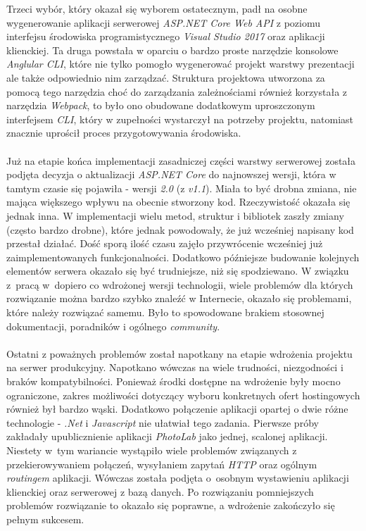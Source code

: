 Trzeci wybór, który okazał się wyborem ostatecznym, padł na osobne wygenerowanie aplikacji serwerowej \textit{ASP.NET Core Web API} z poziomu interfejsu środowiska programistycznego \textit{Visual Studio 2017} oraz aplikacji klienckiej. Ta druga powstała w oparciu o bardzo proste narzędzie konsolowe \textit{Anglular CLI}, które nie tylko pomogło wygenerować projekt warstwy prezentacji ale także odpowiednio nim zarządzać. Struktura projektowa utworzona za pomocą tego narzędzia choć do zarządzania zależnościami również korzystała z narzędzia \textit{Webpack}, to było ono obudowane dodatkowym uproszczonym interfejsem \textit{CLI}, który w zupełności wystarczył na potrzeby projektu, natomiast znacznie uprościł proces przygotowywania środowiska.\\
\\
Już na etapie końca implementacji zasadniczej części warstwy serwerowej została podjęta decyzja o aktualizacji \textit{ASP.NET Core} do najnowszej wersji, która w tamtym czasie się pojawiła - wersji \textit{2.0} (z \textit{v1.1}). Miała to być drobna zmiana, nie mająca większego wpływu na obecnie stworzony kod. Rzeczywistość okazała się jednak inna. W implementacji wielu metod, struktur i bibliotek zaszły zmiany (często bardzo drobne), które jednak powodowały, że już wcześniej napisany kod przestał działać. Dość sporą ilość czasu zajęło przywrócenie wcześniej już zaimplementowanych funkcjonalności. Dodatkowo późniejsze budowanie kolejnych elementów serwera okazało się być trudniejsze, niż się spodziewano. W związku z~pracą w~dopiero co wdrożonej wersji technologii, wiele problemów dla których rozwiązanie można bardzo szybko znaleźć w Internecie, okazało się problemami, które należy rozwiązać samemu. Było to spowodowane brakiem stosownej dokumentacji, poradników i ogólnego \textit{community}.\\
\\
Ostatni z poważnych problemów został napotkany na etapie wdrożenia projektu na serwer produkcyjny. Napotkano wówczas na wiele trudności, niezgodności i braków kompatybilności. Ponieważ środki dostępne na wdrożenie były mocno ograniczone, zakres możliwości dotyczący wyboru konkretnych ofert hostingowych również był bardzo wąski. Dodatkowo połączenie aplikacji opartej o dwie różne technologie - \textit{.Net} i \textit{Javascript} nie ułatwiał tego zadania. Pierwsze próby zakładały upublicznienie aplikacji \textit{PhotoLab} jako jednej, scalonej aplikacji. Niestety w~tym wariancie wystąpiło wiele problemów związanych z przekierowywaniem połączeń, wysyłaniem zapytań \textit{HTTP} oraz ogólnym \textit{routingem} aplikacji. Wówczas została podjęta o~osobnym wystawieniu aplikacji klienckiej oraz serwerowej z bazą danych. Po rozwiązaniu pomniejszych problemów rozwiązanie to okazało się poprawne, a wdrożenie zakończyło się pełnym sukcesem.\\

